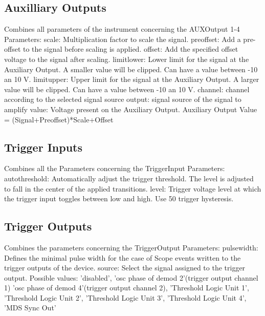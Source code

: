 \documentclass[11pt]{article} %
\begin{document}
\subsection{Auxilliary Outputs}
    Combines all parameters of the instrument concerning the AUXOutput 1-4
    Parameters:
            scale: Multiplication factor to scale the signal. 
            preoffset: Add a pre-offset to the signal before scaling is applied.
            offset: Add the specified offset voltage to the signal after scaling.
            limitlower: Lower limit for the signal at the Auxiliary Output. 
                A smaller value will be clipped. Can have a value between -10 an 10 V.
            limitupper: Upper limit for the signal at the Auxiliary Output. 
                A larger value will be clipped. Can have a value between -10 an 10 V.
            channel: channel according to the selected signal source
            output: signal source of the signal to amplify 
            value: Voltage present on the Auxiliary Output.
                Auxiliary Output Value = (Signal+Preoffset)*Scale+Offset


\subsection{Trigger Inputs}
    Combines all the Parameters concerning the TriggerInput
    Parameters:
            autothreshold: Automatically adjust the trigger threshold. The level
                is adjusted to fall in the center of the applied transitions.
            level: Trigger voltage level at which the trigger input toggles between
                low and high. Use 50%
                trigger hysteresis.


\subsection{Trigger Outputs}
    Combines the parameters concerning the TriggerOutput
    Parameters: 
            pulsewidth: Defines the minimal pulse width for the case of Scope events
                written to the trigger outputs of the device.
            source: Select the signal assigned to the trigger output.
                Possible values: 'disabled', 'osc phase of demod 2'(trigger output channel 1)
                    'osc phase of demod 4'(trigger output channel 2), 
                    'Threshold Logic Unit 1', 'Threshold Logic Unit 2',
                    'Threshold Logic Unit 3', 'Threshold Logic Unit 4',
                    'MDS Sync Out'
\end{document}
